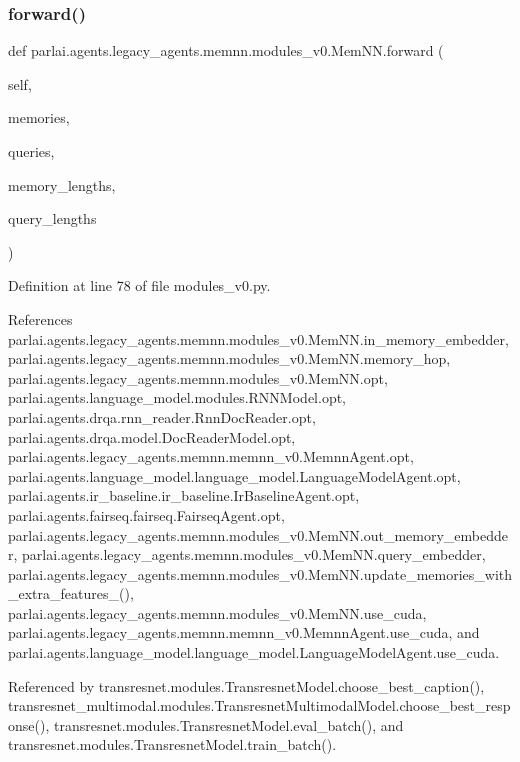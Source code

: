 \subsubsection{\texorpdfstring{forward()}{forward()}}
{\footnotesize\ttfamily def parlai.\+agents.\+legacy\+\_\+agents.\+memnn.\+modules\+\_\+v0.\+Mem\+N\+N.\+forward (\begin{DoxyParamCaption}\item[{}]{self,  }\item[{}]{memories,  }\item[{}]{queries,  }\item[{}]{memory\+\_\+lengths,  }\item[{}]{query\+\_\+lengths }\end{DoxyParamCaption})}



Definition at line 78 of file modules\+\_\+v0.\+py.



References parlai.\+agents.\+legacy\+\_\+agents.\+memnn.\+modules\+\_\+v0.\+Mem\+N\+N.\+in\+\_\+memory\+\_\+embedder, parlai.\+agents.\+legacy\+\_\+agents.\+memnn.\+modules\+\_\+v0.\+Mem\+N\+N.\+memory\+\_\+hop, parlai.\+agents.\+legacy\+\_\+agents.\+memnn.\+modules\+\_\+v0.\+Mem\+N\+N.\+opt, parlai.\+agents.\+language\+\_\+model.\+modules.\+R\+N\+N\+Model.\+opt, parlai.\+agents.\+drqa.\+rnn\+\_\+reader.\+Rnn\+Doc\+Reader.\+opt, parlai.\+agents.\+drqa.\+model.\+Doc\+Reader\+Model.\+opt, parlai.\+agents.\+legacy\+\_\+agents.\+memnn.\+memnn\+\_\+v0.\+Memnn\+Agent.\+opt, parlai.\+agents.\+language\+\_\+model.\+language\+\_\+model.\+Language\+Model\+Agent.\+opt, parlai.\+agents.\+ir\+\_\+baseline.\+ir\+\_\+baseline.\+Ir\+Baseline\+Agent.\+opt, parlai.\+agents.\+fairseq.\+fairseq.\+Fairseq\+Agent.\+opt, parlai.\+agents.\+legacy\+\_\+agents.\+memnn.\+modules\+\_\+v0.\+Mem\+N\+N.\+out\+\_\+memory\+\_\+embedder, parlai.\+agents.\+legacy\+\_\+agents.\+memnn.\+modules\+\_\+v0.\+Mem\+N\+N.\+query\+\_\+embedder, parlai.\+agents.\+legacy\+\_\+agents.\+memnn.\+modules\+\_\+v0.\+Mem\+N\+N.\+update\+\_\+memories\+\_\+with\+\_\+extra\+\_\+features\+\_\+(), parlai.\+agents.\+legacy\+\_\+agents.\+memnn.\+modules\+\_\+v0.\+Mem\+N\+N.\+use\+\_\+cuda, parlai.\+agents.\+legacy\+\_\+agents.\+memnn.\+memnn\+\_\+v0.\+Memnn\+Agent.\+use\+\_\+cuda, and parlai.\+agents.\+language\+\_\+model.\+language\+\_\+model.\+Language\+Model\+Agent.\+use\+\_\+cuda.



Referenced by transresnet.\+modules.\+Transresnet\+Model.\+choose\+\_\+best\+\_\+caption(), transresnet\+\_\+multimodal.\+modules.\+Transresnet\+Multimodal\+Model.\+choose\+\_\+best\+\_\+response(), transresnet.\+modules.\+Transresnet\+Model.\+eval\+\_\+batch(), and transresnet.\+modules.\+Transresnet\+Model.\+train\+\_\+batch().

